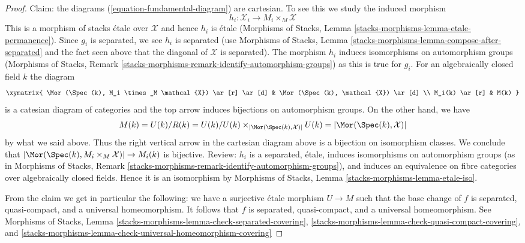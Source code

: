 \begin{proof}
\medskip\noindent
Claim: the diagrams (\ref{equation-fundamental-diagram}) are cartesian.
To see this we study the induced morphism
$$
h_i : \mathcal{X}_i \longrightarrow M_i \times_M \mathcal{X}
$$
This is a morphism of stacks \'etale over $\mathcal{X}$
and hence $h_i$ is \'etale (Morphisms of Stacks, Lemma
\ref{stacks-morphisms-lemma-etale-permanence}).
Since $g_i$ is separated, we see $h_i$ is separated
(use Morphisms of Stacks, Lemma
\ref{stacks-morphisms-lemma-compose-after-separated} and the fact
seen above that the diagonal of $\mathcal{X}$ is separated).
The morphism $h_i$ induces isomorphisms on automorphism groups
(Morphisms of Stacks, Remark
\ref{stacks-morphisms-remark-identify-automorphism-groups})
as this is true for $g_i$. For an algebraically closed field $k$
the diagram
$$
\xymatrix{
\Mor(\Spec(k), M_i \times_M \mathcal{X}) \ar[r] \ar[d] &
\Mor(\Spec(k), \mathcal{X}) \ar[d] \\
M_i(k) \ar[r] &
M(k)
}
$$
is a catesian diagram of categories and the top arrow
induces bijections on automorphism groups.
On the other hand, we have
$$
M(k) = U(k)/R(k) = U(k)/
U(k) \times_{|\Mor(\Spec(k), \mathcal{X})|} U(k) =
|\Mor(\Spec(k), \mathcal{X})|
$$
by what we said above. Thus the right vertical arrow in the
cartesian diagram above is a bijection on isomorphism classes.
We conclude that
$|\Mor(\Spec(k), M_i \times_M \mathcal{X})| \to M_i(k)$ is bijective.
Review: $h_i$ is a separated, \'etale, induces isomorphisms on
automorphism groups (as in Morphisms of Stacks, Remark
\ref{stacks-morphisms-remark-identify-automorphism-groups}), and
induces an equivalence on fibre categories over algebraically closed fields.
Hence it is an isomorphism by Morphisms of Stacks, Lemma
\ref{stacks-morphisms-lemma-etale-iso}.

\medskip\noindent
From the claim we get in particular the following:
we have a surjective \'etale morphism $U \to M$
such that the base change of $f$ is separated, quasi-compact,
and a universal homeomorphism. It follows that $f$ is separated,
quasi-compact, and a universal homeomorphism.
See Morphisms of Stacks, Lemma
\ref{stacks-morphisms-lemma-check-separated-covering},
\ref{stacks-morphisms-lemma-check-quasi-compact-covering}, and
\ref{stacks-morphisms-lemma-check-universal-homeomorphism-covering}


\end{proof}
